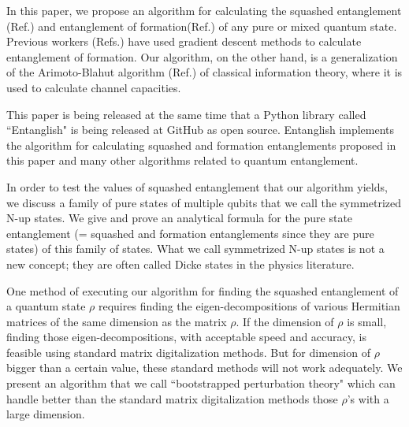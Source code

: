 \documentclass[12pt]{article}%
\begin{document}
In this paper, we propose an algorithm
for calculating the squashed entanglement
(Ref.\cite{sq-wiki}) and entanglement of
formation(Ref.\cite{Wot}) of
any pure or mixed quantum state.
Previous workers (Refs.\cite{Aud, Git, Ryu}) have
used gradient descent methods to
calculate entanglement of formation.
Our algorithm, on the other hand, is a generalization
of the Arimoto-Blahut algorithm (Ref.\cite{ab-algo})
 of classical
information theory,
where it is used to calculate channel capacities.

This paper is being released at the same time that
a Python library called ``Entanglish"
is being released at GitHub as open source.
Entanglish implements the algorithm for
calculating squashed and formation entanglements proposed
in this paper and many other algorithms related
to quantum entanglement.

In order to test
the values of squashed
entanglement that our algorithm
yields, we discuss
a family of pure states of multiple qubits
that we call the symmetrized N-up states.
We give and prove an analytical formula
for the pure state entanglement
(= squashed and formation entanglements since they are pure states) of this
family of states. What we call symmetrized N-up states
is not a new concept; they are often called Dicke states in the
physics literature.


One method of executing our algorithm for finding the
squashed entanglement of a quantum state $\rho$ requires
finding the eigen-decompositions of
various Hermitian matrices
of the same dimension
as the matrix $\rho$.
If the dimension of $\rho$
is small, finding
those eigen-decompositions,
with acceptable
speed and accuracy,
is feasible
using standard matrix
digitalization methods.
But
for dimension of $\rho$
bigger than a certain
value, these standard methods
will not work adequately.
We present an algorithm
that we call ``bootstrapped perturbation
theory" which
can handle better
than the standard
matrix digitalization methods
those $\rho$'s
with a large dimension.
\end{document}
